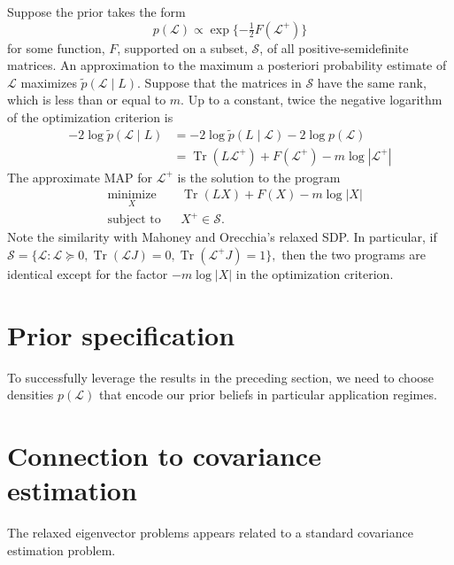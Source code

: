 \documentclass[12pt]{article}
\DeclareMathOperator*{\Tr}{Tr}
\theoremstyle{plain}
\begin{document}
Suppose the prior takes the form
\[
  p(\mathcal{L}) \propto \exp\{ -\tfrac{1}{2} F(\mathcal{L^+}) \}
\]
for some function, $F$, supported on a subset, $\mathcal{S}$, of all
positive-semidefinite matrices.  An approximation to the
maximum a posteriori probability estimate of $\mathcal{L}$ maximizes
$\tilde p(\mathcal{L} \mid L)$.  Suppose that the
matrices in $\mathcal{S}$ have the same rank, which is less than or
equal to $m$.
Up to a constant, twice the negative logarithm of the optimization criterion is
\begin{align*}
  -2 \log \tilde p(\mathcal{L} \mid L)
   &= - 2 \log \tilde p(L \mid \mathcal{L}) - 2 \log p(\mathcal{L}) \\
   &= \Tr(L \mathcal{L}^+) + F(\mathcal{L^+}) - m \log | \mathcal{L}^+ |
\end{align*}
The approximate MAP for $\mathcal{L}^+$ is the solution to the program
\[
\begin{aligned}
  & \underset{X}{\text{minimize}}
  & & \Tr(L X) + F(X) - m \log |X| \\
  & \text{subject to}
  & & X^+ \in \mathcal{S}.
\end{aligned}
\]
Note the similarity with Mahoney and Orecchia's relaxed SDP.
In particular, if
\(
  \mathcal{S} = \{ \mathcal{L} : \mathcal{L} \succeq 0,
  \Tr(\mathcal{L} J) = 0, \Tr(\mathcal{L}^{+} J) = 1 \},
\)
then the two programs are identical except for the factor
$-m \log |X|$ in the optimization criterion.


\section{Prior specification}

To successfully leverage the results in the preceding section, we need
to choose densities $p(\mathcal{L})$ that encode our prior beliefs in
particular application regimes.



\clearpage

\section{Connection to covariance estimation}
\label{S:connection-to-covariance}

The relaxed eigenvector problems appears related to a standard covariance estimation problem.
\end{document}
